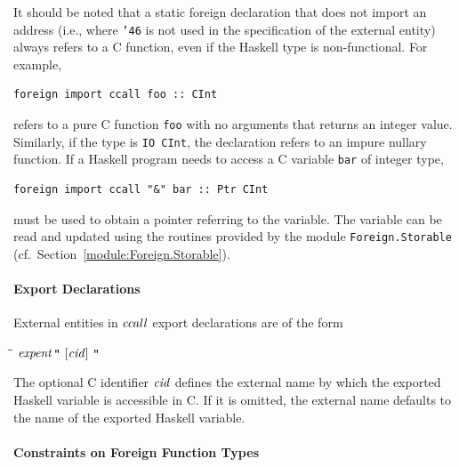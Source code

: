 It should be noted that a static foreign declaration that does not import an
address (i.e., where \mbox{\tt {\char'46}} is not used in the specification of the external
entity) always refers to a C function, even if the Haskell type is
non-functional.  For example, 
\bprog
{\small\begin{verbatim}
foreign import ccall foo :: CInt
\end{verbatim}}
\eprog
refers to a pure C function \mbox{\tt foo} with no arguments that returns an
integer value.  Similarly, if the type is \mbox{\tt IO\ CInt}, the declaration
refers to an impure nullary function.  If a Haskell program needs to access a
C variable \mbox{\tt bar} of integer type,
\bprog
{\small\begin{verbatim}
foreign import ccall "&" bar :: Ptr CInt
\end{verbatim}}
\eprog
must be used to obtain a pointer referring to the variable.  The variable can
be read and updated using the routines provided by the module \mbox{\tt Foreign.Storable}
(cf.\ Section~\ref{module:Foreign.Storable}).

\paragraph{Export Declarations}

External entities in \mbox{$\it ccall$} export declarations are of the form
%
\begin{flushleft}\it\begin{tabbing}
\hspace{0.6in}\=\hspace{3.1in}\=\kill
$\it expent$\>\makebox[3.5em]{$\rightarrow$}$\it \makebox{\tt "}\ [cid]\ \makebox{\tt "}$
\end{tabbing}\end{flushleft}
%
The optional C identifier \mbox{$\it cid$} defines the external name by which the
exported Haskell variable is accessible in C.  If it is omitted, the external
name defaults to the name of the exported Haskell variable.

\paragraph{Constraints on Foreign Function Types}

